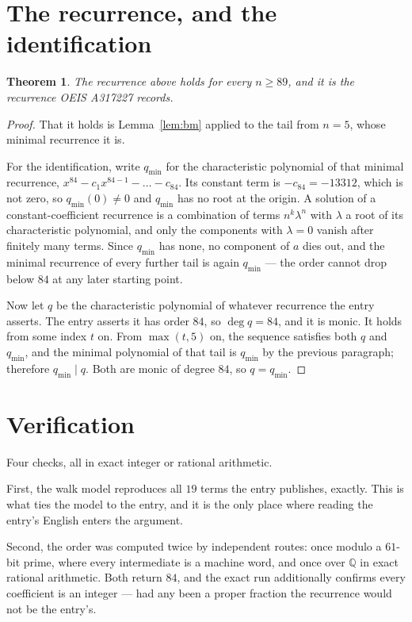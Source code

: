 \documentclass[11pt,a4paper]{article}
\theoremstyle{plain}
\newtheorem{theorem}{Theorem}
\theoremstyle{definition}
\begin{document}
\section{The recurrence, and the identification}

\begin{theorem}
The recurrence above holds for every $n\ge89$, and it is the recurrence OEIS A317227 records.
\end{theorem}

\begin{proof}
That it holds is Lemma~\ref{lem:bm} applied to the tail from $n=5$, whose minimal
recurrence it is.

For the identification, write $q_{\min}$ for the characteristic polynomial of that minimal
recurrence, $x^{84}-c_1x^{84-1}-\dots-c_{84}$. Its constant term is
$-c_{84}=-13312$, which is not zero, so $q_{\min}(0)\neq0$ and $q_{\min}$ has no
root at the origin. A solution of a constant-coefficient recurrence is a combination of terms
$n^{k}\lambda^{n}$ with $\lambda$ a root of its characteristic polynomial, and only the
components with $\lambda=0$ vanish after finitely many terms. Since $q_{\min}$ has none, no
component of $a$ dies out, and the minimal recurrence of every further tail is again
$q_{\min}$ --- the order cannot drop below $84$ at any later starting point.

Now let $q$ be the characteristic polynomial of whatever recurrence the entry asserts. The
entry asserts it has order $84$, so $\deg q=84$, and it is monic. It holds from some
index $t$ on. From $\max(t,5)$ on, the sequence satisfies both $q$ and $q_{\min}$, and
the minimal polynomial of that tail is $q_{\min}$ by the previous paragraph; therefore
$q_{\min}\mid q$. Both are monic of degree $84$, so $q=q_{\min}$.
\end{proof}

\section{Verification}

Four checks, all in exact integer or rational arithmetic.

First, the walk model reproduces all $19$ terms the entry publishes, exactly. This is
what ties the model to the entry, and it is the only place where reading the entry's English
enters the argument.

Second, the order was computed twice by independent routes: once modulo a $61$-bit prime, where
every intermediate is a machine word, and once over $\mathbb{Q}$ in exact rational arithmetic.
Both return $84$, and the exact run additionally confirms every coefficient is an integer
--- had any been a proper fraction the recurrence would not be the entry's.
\end{document}
